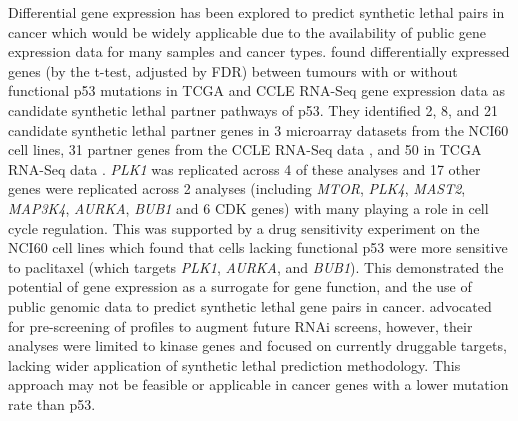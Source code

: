 Differential \gls{gene expression} has been explored to predict \gls{synthetic lethal} pairs in cancer which would be widely applicable due to the availability of public \gls{gene expression} data for many samples and cancer types. \citet{Wang2013} found differentially expressed genes (by the t-test, adjusted by \gls{FDR}) between \glspl{tumour} with or without functional p53 \glspl{mutation} in \gls{TCGA} \citep{TCGA2008GBM} and \gls{CCLE} \citep{Barretina2012} \gls{RNA-Seq} \gls{gene expression} data as candidate \gls{synthetic lethal} partner pathways of p53. They identified 2, 8, and 21 candidate \gls{synthetic lethal} partner genes in 3 \gls{microarray} datasets from the NCI60 cell lines, 31 partner genes from the \gls{CCLE} \gls{RNA-Seq} data \citep{Barretina2012}, and 50 in \gls{TCGA} \gls{RNA-Seq} data \citep{TCGA2012CRC}. \textit{PLK1} was replicated across 4 of these analyses and 17 other genes were replicated across 2 analyses (including \textit{MTOR}, \textit{PLK4}, \textit{MAST2}, \textit{MAP3K4}, \textit{AURKA}, \textit{BUB1} and 6 CDK genes) with many playing a role in cell cycle regulation. This was supported by a drug sensitivity experiment on the NCI60 cell lines which found that cells lacking functional p53 were more sensitive to paclitaxel (which targets \textit{PLK1}, \textit{AURKA}, and \textit{BUB1}). This demonstrated the potential of \gls{gene expression} as a surrogate for gene function, and the use of public \gls{genomic} data to predict \gls{synthetic lethal} gene pairs in cancer. \citet{Wang2013} advocated for pre-screening of  profiles to augment future \gls{RNAi} screens, however, their analyses were limited to kinase genes and focused on currently druggable targets, lacking wider application of \gls{synthetic lethal} prediction methodology. This approach may not be feasible or applicable in \glspl{cancer gene} with a lower \gls{mutation} rate than p53.  

